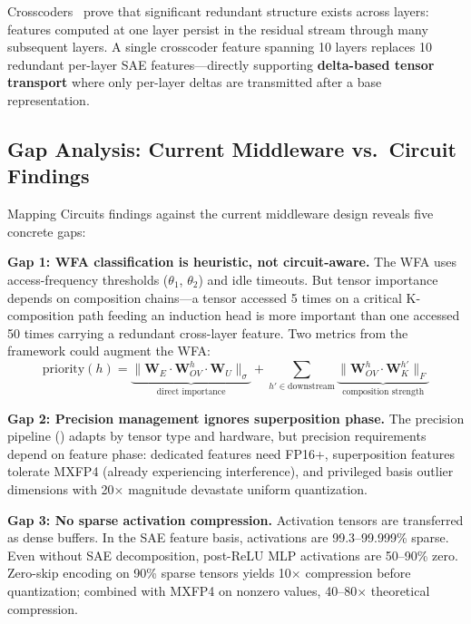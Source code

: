 \documentclass[11pt,letterpaper]{article}
\theoremstyle{definition}
\begin{document}
Crosscoders~\cite{anthropic2024crosscoders} prove that significant redundant structure exists across layers: features computed at one layer persist in the residual stream through many subsequent layers. A single crosscoder feature spanning 10 layers replaces 10 redundant per-layer SAE features---directly supporting \textbf{delta-based tensor transport} where only per-layer deltas are transmitted after a base representation.

\subsection{Gap Analysis: Current Middleware vs.\ Circuit Findings}
\label{sec:circuits-gaps}

Mapping Circuits findings against the current middleware design reveals five concrete gaps:

\textbf{Gap 1: WFA classification is heuristic, not circuit-aware.} The WFA uses access-frequency thresholds ($\theta_1$, $\theta_2$) and idle timeouts. But tensor importance depends on composition chains---a tensor accessed 5 times on a critical K-composition path feeding an induction head is more important than one accessed 50 times carrying a redundant cross-layer feature. Two metrics from the framework could augment the WFA:
\begin{equation}
    \text{priority}(h) = \underbrace{\|\mathbf{W}_E \cdot \mathbf{W}_{OV}^h \cdot \mathbf{W}_U\|_\sigma}_{\text{direct importance}} + \sum_{h' \in \text{downstream}} \underbrace{\|\mathbf{W}_{OV}^h \cdot \mathbf{W}_K^{h'}\|_F}_{\text{composition strength}}
\end{equation}

\textbf{Gap 2: Precision management ignores superposition phase.} The precision pipeline () adapts by tensor type and hardware, but precision requirements depend on feature phase: dedicated features need FP16+, superposition features tolerate MXFP4 (already experiencing interference), and privileged basis outlier dimensions with 20$\times$ magnitude devastate uniform quantization.

\textbf{Gap 3: No sparse activation compression.} Activation tensors are transferred as dense buffers. In the SAE feature basis, activations are 99.3--99.999\% sparse. Even without SAE decomposition, post-ReLU MLP activations are 50--90\% zero. Zero-skip encoding on 90\% sparse tensors yields 10$\times$ compression before quantization; combined with MXFP4 on nonzero values, 40--80$\times$ theoretical compression.
\end{document}
